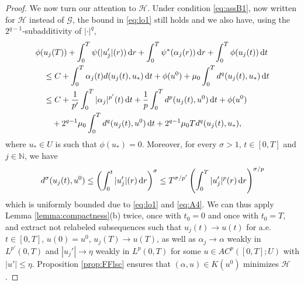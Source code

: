 \documentclass[reqno]{amsart}
\newcommand{\Nz}{\mathbb{N}}
\newcommand{\dr}{{\rm d} r}
\newcommand{\GG}{{\mathcal G}}
\newcommand{\HH}{{\mathcal H}}
\renewcommand{\d}{{\rm d}}
\begin{document}
\begin{proof}
We now turn our attention to $\HH$. Under condition
  \eqref{eq:assB1}, now written for $\HH$ instead of $\GG$,  the bound in \eqref{eq:lo1} still holds and we also have, using the $2^{q-1}$-subadditivity  of  $|\cdot|^q$,  
 \begin{align*}
  &\phi(u_j(T)) +  \int_0^T \psi(|u_j'| (r))\, \dr +  \int_0^T
  \psi^*(\alpha_j(r))\, \dr + \int_0^T \phi(u_j(t))\, \d t \\
  &\quad \leq  C  +\int_0^T \alpha_j(t) d (u_j(t),u_*)\, \d t +
\phi(u^0)  +  \mu_0  \int_0^T d^q(u_j(t), u_*)\, \d t \\
& \quad  \le C+ \frac{1}{p'}\int_0^T|\alpha_j|^{p'}(t)\, \d t+ \frac1p\int_0^T
     d^p(u_j(t),u^0) \, \d t + \phi(u^0)\\
     &\qquad +  { 2^{q-1} \mu_0 } \int_0^T d^q(u_j(t),
       u^0) \, \d t + { 2^{q-1} \mu_0   T} d^q(u_j(t), u_*),
 \end{align*}
 where $u_* \in U$ is such that $\phi(u_*)=0$. Moreover, for every $\sigma>1$, $t \in [0,T]$ and $j \in \Nz$, we have
\[
d^\sigma(u_j(t), u^0) \le \left ( \int_0^t |u_j'|(r) \, \d r \right )^\sigma \le T^{\sigma/p'}\left ( \int_0^T |u_j'|^p(r) \, \d r \right )^{\sigma/p} 
\]
which is uniformly bounded due to \eqref{eq:lo1} and \eqref{eq:A4}. We can thus apply Lemma \ref{lemma:compactness}(b) twice, once with $t_0=0$ and once with $t_0=T$, and extract not relabeled subsequences such that $u_j (t) \to u(t)$ for
a.e. $t \in [0,T]$, $u(0)=u^0$, $u_j(T) \to u(T)$, as well as  $\alpha_j \to \alpha$ weakly in
$L^{p'}(0,T)$ and $|u_j'|\to \eta$ weakly in $L^p(0,T)$ for some $u \in AC^p([0,T];U)$ with $|u'| \le \eta$.  Proposition \ref{prop:FFlsc} ensures that
$(\alpha,u)\in K(u^0)$ minimizes $\HH $.  
\end{proof}
\end{document}
